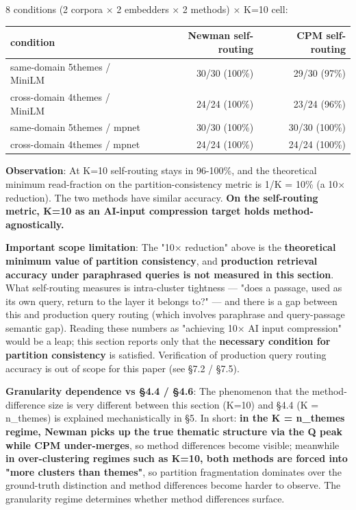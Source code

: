 \documentclass[
]{article}
\newcounter{none} %
\begin{document}
8 conditions (2 corpora × 2 embedders × 2 methods) × K=10 cell:

{\def\LTcaptype{none} %
\begin{longtable}[]{@{}lrr@{}}
\toprule\noalign{}
condition & Newman self-routing & CPM self-routing \\
\midrule\noalign{}
\endhead
\bottomrule\noalign{}
\endlastfoot
same-domain 5themes / MiniLM & 30/30 (100\%) & 29/30 (97\%) \\
cross-domain 4themes / MiniLM & 24/24 (100\%) & 23/24 (96\%) \\
same-domain 5themes / mpnet & 30/30 (100\%) & 30/30 (100\%) \\
cross-domain 4themes / mpnet & 24/24 (100\%) & 24/24 (100\%) \\
\end{longtable}
}

\textbf{Observation}: At K=10 self-routing stays in 96-100\%, and the
theoretical minimum read-fraction on the partition-consistency metric is
1/K = 10\% (a 10× reduction). The two methods have similar accuracy.
\textbf{On the self-routing metric, K=10 as an AI-input compression
target holds method-agnostically.}

\textbf{Important scope limitation}: The "10× reduction" above is the
\textbf{theoretical minimum value of partition consistency}, and
\textbf{production retrieval accuracy under paraphrased queries is not
measured in this section}. What self-routing measures is intra-cluster
tightness --- "does a passage, used as its own query, return to the
layer it belongs to?" --- and there is a gap between this and production
query routing (which involves paraphrase and query-passage semantic
gap). Reading these numbers as "achieving 10× AI input compression"
would be a leap; this section reports only that the \textbf{necessary
condition for partition consistency} is satisfied. Verification of
production query routing accuracy is out of scope for this paper (see
§7.2 / §7.5).

\textbf{Granularity dependence vs §4.4 / §4.6}: The phenomenon that the
method-difference size is very different between this section (K=10) and
§4.4 (K = n\_themes) is explained mechanistically in §5. In short:
\textbf{in the K = n\_themes regime, Newman picks up the true thematic
structure via the Q peak while CPM under-merges}, so method differences
become visible; meanwhile \textbf{in over-clustering regimes such as
K=10, both methods are forced into "more clusters than themes"}, so
partition fragmentation dominates over the ground-truth distinction and
method differences become harder to observe. The granularity regime
determines whether method differences surface.
\end{document}
